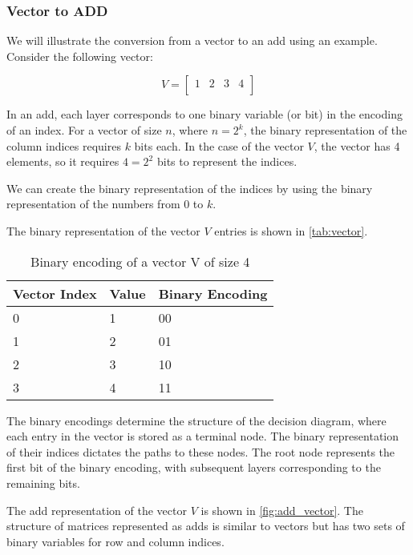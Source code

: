 \subsubsection{Vector to ADD}
We will illustrate the conversion from a vector to an \gls{add} using an example.
Consider the following vector:

\[
    V=
    \begin{bmatrix}
        1 & 2 & 3 & 4 \\
    \end{bmatrix}
\]

In an \gls{add}, each layer corresponds to one binary variable (or bit) in the encoding of an index.
For a vector of size $n$, where $n = 2^k$, the binary representation of the column indices requires $k$ bits each.
In the case of the vector $V$, the vector has 4 elements, so it requires $4 = 2^2$ bits to represent the indices.

We can create the binary representation of the indices by using the binary representation of the numbers from 0 to $k$.

The binary representation of the vector $V$ entries is shown in \autoref{tab:vector}.


\begin{table}[htb!]
    \centering
    \caption{Binary encoding of a vector V of size 4}
    \label{tab:vector}
    \begin{tabular}{lll}
        \toprule
        Vector Index & Value & Binary Encoding \\
        \midrule
        0            & 1     & 00              \\
        1            & 2     & 01              \\
        2            & 3     & 10              \\
        3            & 4     & 11              \\
        \bottomrule
    \end{tabular}
\end{table}


The binary encodings determine the structure of the decision diagram, where each entry in the vector is stored as a terminal node.
The binary representation of their indices dictates the paths to these nodes.
The root node represents the first bit of the binary encoding, with subsequent layers corresponding to the remaining bits.

The \gls{add} representation of the vector $V$ is shown in \autoref{fig:add_vector}.
The structure of matrices represented as \glspl{add} is similar to vectors but has two sets of binary variables for row and column indices.

